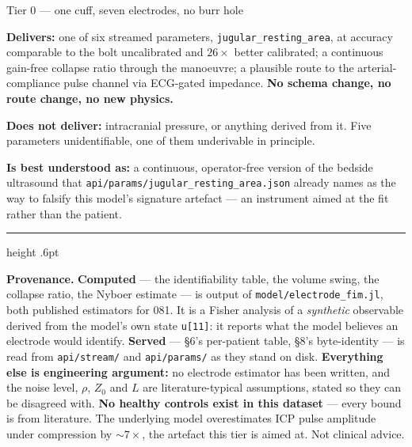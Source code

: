 \documentclass[10pt,a4paper]{article}
\begin{document}
\begin{cbox}[elec]{Tier 0 --- one cuff, seven electrodes, no burr hole}
\raggedright
\textbf{Delivers:} one of six streamed parameters, \texttt{jugular\_resting\_area}, at
accuracy comparable to the bolt uncalibrated and $26\times$ better calibrated; a continuous
gain-free collapse ratio through the manoeuvre; a plausible route to the arterial-compliance
pulse channel via ECG-gated impedance. \textbf{No schema change, no route change, no new
physics.}

\textbf{Does not deliver:} intracranial pressure, or anything derived from it. Five
parameters unidentifiable, one of them underivable in principle.

\textbf{Is best understood as:} a continuous, operator-free version of the bedside
ultrasound that \texttt{api/params/jugular\_resting\_area.json} already names as the way to
falsify this model's signature artefact --- an instrument aimed at the fit rather than the
patient.
\end{cbox}

\enlargethispage{2.2\baselineskip}
\vspace{4pt}
{\color{rulec}\hrule height .6pt}
\vspace{3pt}
{\fontsize{7.3}{8.8}\selectfont\color{faint}
\textbf{Provenance.} \textbf{Computed} --- the identifiability table, the volume swing,
the collapse ratio, the Nyboer estimate --- is output of
\texttt{model/electrode\_fim.jl}, both published estimators for 081. It is a Fisher
analysis of a \emph{synthetic} observable derived from the model's own state
\texttt{u[11]}: it reports what the model believes an electrode would identify.
\textbf{Served} --- \S6's per-patient table, \S8's byte-identity --- is read from
\texttt{api/stream/} and \texttt{api/params/} as they stand on disk. \textbf{Everything
else is engineering argument:} no electrode estimator has been written, and the noise
level, $\rho$, $Z_0$ and $L$ are literature-typical assumptions, stated so they can be
disagreed with. \textbf{No healthy controls exist in this dataset} --- every bound is from
literature. The underlying model overestimates ICP pulse amplitude under compression by
${\sim}7\times$, the artefact this tier is aimed at. Not clinical advice.}
\end{document}
